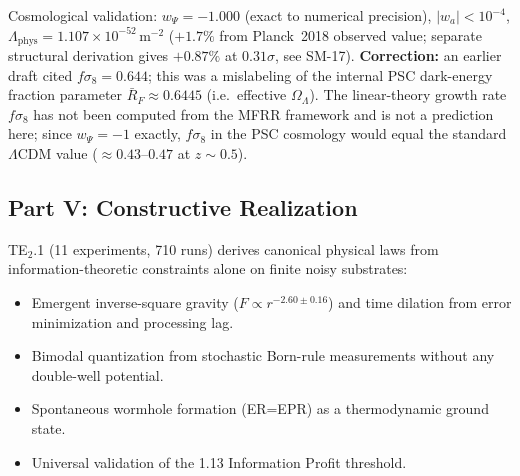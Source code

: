 \documentclass[11pt]{article}
\begin{document}
Cosmological validation: $w_\Psi=-1.000$ (exact to numerical precision), $|w_a|<10^{-4}$, $\Lambda_\mathrm{phys}=1.107\times10^{-52}\,\mathrm{m}^{-2}$ ($+1.7\%$ from Planck~2018 observed value; separate structural derivation gives $+0.87\%$ at $0.31\sigma$, see SM-17). \textbf{Correction:} an earlier draft cited $f\sigma_8=0.644$; this was a mislabeling of the internal PSC dark-energy fraction parameter $\bar{R}_F\approx0.6445$ (i.e.\ effective $\Omega_\Lambda$). The linear-theory growth rate $f\sigma_8$ has not been computed from the MFRR framework and is not a prediction here; since $w_\Psi=-1$ exactly, $f\sigma_8$ in the PSC cosmology would equal the standard $\Lambda$CDM value ($\approx0.43$--$0.47$ at $z\sim0.5$).

\subsection{Part V: Constructive Realization}

TE$_2$.1 (11 experiments, 710 runs) derives canonical physical laws from information-theoretic constraints alone on finite noisy substrates:
\begin{itemize}[nosep]
\item Emergent inverse-square gravity ($F\propto r^{-2.60\pm0.16}$) and time dilation from error minimization and processing lag.
\item Bimodal quantization from stochastic Born-rule measurements without any double-well potential.
\item Spontaneous wormhole formation (ER=EPR) as a thermodynamic ground state.
\item Universal validation of the 1.13 Information Profit threshold.
\end{itemize}
\end{document}
